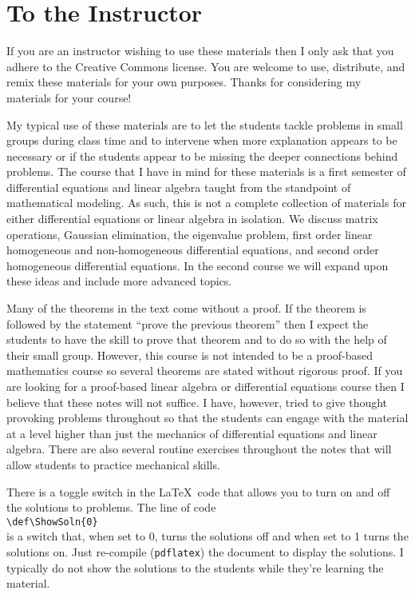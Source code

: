 
\section{To the Instructor}
If you are an instructor wishing to use these materials then I only ask that you adhere to the
Creative Commons license.  You are welcome to use, distribute, and remix these materials
for your own purposes.  Thanks for considering my materials for your course!

My typical use of these materials are to let the students tackle problems in small groups
during class time and to intervene when more explanation appears to be necessary or if
the students appear to be missing the deeper connections behind problems.  The course that
I have in mind for these materials is a first semester of differential equations and
linear algebra taught from the standpoint of mathematical modeling.  As such, this is not a complete collection of materials for either
differential equations or linear algebra in isolation.  We discuss
matrix operations, Gaussian elimination, the eigenvalue problem, first order linear
homogeneous and non-homogeneous differential equations, and second order homogeneous
differential equations.  In the second course we will expand upon these ideas and include
more advanced topics.

Many of the theorems in the text come without a proof.  If the theorem is followed by the
statement ``prove the previous theorem'' then I expect the students to have the skill to
prove that theorem and to do so with the help of their small group.  However, this course
is not intended to be a proof-based mathematics course so several theorems are stated
without rigorous proof. If you are looking for a proof-based linear algebra or
differential equations course then I believe that these notes will not suffice.  I have,
however, tried to give thought provoking problems throughout so that the students can
engage with the material at a level higher than just the mechanics of differential
equations and linear algebra.  There are also several routine exercises
throughout the notes that will allow students to practice mechanical skills.

There is a toggle switch in the \LaTeX\ code that
allows you to turn on and off the solutions to problems.  The line of code \\
\verb|\def\ShowSoln{0}|\\
is a switch that, when set to 0, turns the solutions off and when set to 1 turns the
solutions on.  Just re-compile (\texttt{pdflatex}) the document to display the solutions.
I typically do not show the solutions to the students while they're learning the material. 
